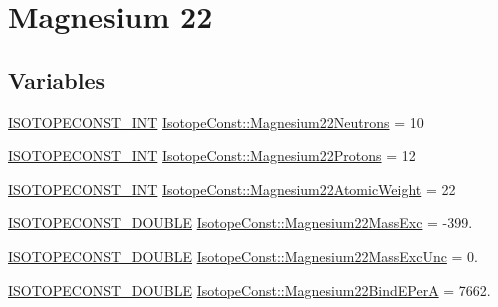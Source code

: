 \hypertarget{group___isotope_const-_magnesium-_mg22}{}\section{Magnesium 22}
\label{group___isotope_const-_magnesium-_mg22}
\subsection*{Variables}
\begin{DoxyCompactItemize}
\item 
\mbox{\hyperlink{group___isotope_const-_macros_ga5f18360b3e99483a35c32d789e62621c}{I\+S\+O\+T\+O\+P\+E\+C\+O\+N\+S\+T\+\_\+\+I\+NT}} \mbox{\hyperlink{group___isotope_const-_magnesium-_mg22_gab579bb50fec9bfdd5d6d9da3eec50d6a}{Isotope\+Const\+::\+Magnesium22\+Neutrons}} = 10
\item 
\mbox{\hyperlink{group___isotope_const-_macros_ga5f18360b3e99483a35c32d789e62621c}{I\+S\+O\+T\+O\+P\+E\+C\+O\+N\+S\+T\+\_\+\+I\+NT}} \mbox{\hyperlink{group___isotope_const-_magnesium-_mg22_gab7566ba7a8f3d6feee38af490aebdf6e}{Isotope\+Const\+::\+Magnesium22\+Protons}} = 12
\item 
\mbox{\hyperlink{group___isotope_const-_macros_ga5f18360b3e99483a35c32d789e62621c}{I\+S\+O\+T\+O\+P\+E\+C\+O\+N\+S\+T\+\_\+\+I\+NT}} \mbox{\hyperlink{group___isotope_const-_magnesium-_mg22_gaac855882f0320e7c536e41be3e1a7fed}{Isotope\+Const\+::\+Magnesium22\+Atomic\+Weight}} = 22
\item 
\mbox{\hyperlink{group___isotope_const-_macros_ga8f45a7272ce02c0b4c65c44636ed719a}{I\+S\+O\+T\+O\+P\+E\+C\+O\+N\+S\+T\+\_\+\+D\+O\+U\+B\+LE}} \mbox{\hyperlink{group___isotope_const-_magnesium-_mg22_ga4ce30ca22e28186bdf379bd46e67a496}{Isotope\+Const\+::\+Magnesium22\+Mass\+Exc}} = -\/399.
\item 
\mbox{\hyperlink{group___isotope_const-_macros_ga8f45a7272ce02c0b4c65c44636ed719a}{I\+S\+O\+T\+O\+P\+E\+C\+O\+N\+S\+T\+\_\+\+D\+O\+U\+B\+LE}} \mbox{\hyperlink{group___isotope_const-_magnesium-_mg22_gaa5effe472c939e5490d487c342e195ab}{Isotope\+Const\+::\+Magnesium22\+Mass\+Exc\+Unc}} = 0.
\item 
\mbox{\hyperlink{group___isotope_const-_macros_ga8f45a7272ce02c0b4c65c44636ed719a}{I\+S\+O\+T\+O\+P\+E\+C\+O\+N\+S\+T\+\_\+\+D\+O\+U\+B\+LE}} \mbox{\hyperlink{group___isotope_const-_magnesium-_mg22_gab8d98b9adabd6328627b3055589cd278}{Isotope\+Const\+::\+Magnesium22\+Bind\+E\+PerA}} = 7662.
\item 

\end{DoxyCompactItemize}
